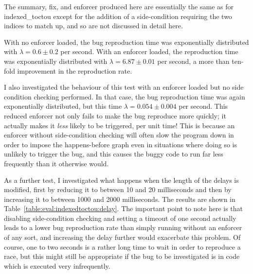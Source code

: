 The summary, fix, and enforcer produced here are essentially the same
as for indexed\_toctou except for the addition of a side-condition
requiring the two indices to match up, and so are not discussed in
detail here.

With no enforcer loaded, the bug reproduction time was exponentially
distributed with $\lambda = 0.6 \pm 0.2$ per second.  With an enforcer
loaded, the reproduction time was exponentially distributed with
$\lambda = 6.87 \pm 0.01$ per second, a more than ten-fold improvement
in the reproduction rate.

I also investigated the behaviour of this test with an enforcer loaded
but no side condition checking performed.  In that case, the bug
reproduction time was again exponentially distributed, but this time
$\lambda = 0.054 \pm 0.004$ per second.  This reduced enforcer not
only fails to make the bug reproduce more quickly; it actually makes
it \emph{less} likely to be triggered, per unit time!  This is because
an enforcer without side-condition checking will often slow the
program down in order to impose the happens-before graph even in
situations where doing so is unlikely to trigger the bug, and this
causes the buggy code to run far less frequently than it otherwise
would.



As a further test, I investigated what happens when the length of the
delays is modified, first by reducing it to between 10 and 20
milliseconds and then by increasing it to between 1000 and 2000
milliseconds.  The results are shown in
Table~\ref{table:eval:indexedtoctou:delay}.  The important point to
note here is that disabling side-condition checking and setting a
timeout of one second actually leads to a lower bug reproduction rate
than simply running without an enforcer of any sort, and increasing
the delay further would exacerbate this problem.  Of course, one to
two seconds is a rather long time to wait in order to reproduce a
race, but this might still be appropriate if the bug to be
investigated is in code which is executed very infrequently.

